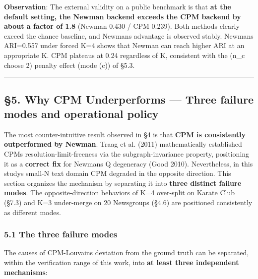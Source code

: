 \documentclass[
]{article}
\begin{document}
\textbf{Observation}: The external validity on a public benchmark is
that \textbf{at the default setting, the Newman backend exceeds the CPM
backend by about a factor of 1.8} (Newman 0.430 / CPM 0.239). Both
methods clearly exceed the chance baseline, and Newman\textquotesingle s
advantage is observed stably. Newman\textquotesingle s ARI=0.557 under
forced K=4 shows that Newman can reach higher ARI at an appropriate K.
CPM plateaus at 0.24 regardless of K, consistent with the (n\_c choose
2) penalty effect (mode (c)) of §5.3.

\begin{center}\rule{0.5\linewidth}{0.5pt}\end{center}

\subsection{§5. Why CPM Underperforms --- Three failure modes and
operational
policy}\label{5-why-cpm-underperforms--three-failure-modes-and-operational-policy}

The most counter-intuitive result observed in §4 is that \textbf{CPM is
consistently outperformed by Newman}. Traag et al. (2011) mathematically
established CPM\textquotesingle s resolution-limit-freeness via the
subgraph-invariance property, positioning it as a \textbf{correct fix}
for Newman\textquotesingle s Q degeneracy (Good 2010). Nevertheless, in
this study\textquotesingle s small-N text domain CPM degraded in the
opposite direction. This section organizes the mechanism by separating
it into \textbf{three distinct failure modes}. The opposite-direction
behaviors of K=4 over-split on Karate Club (§7.3) and K=3 under-merge on
20 Newsgroups (§4.6) are positioned consistently as different modes.

\subsubsection{5.1 The three failure
modes}\label{51-the-three-failure-modes}

The causes of CPM-Louvain\textquotesingle s deviation from the ground
truth can be separated, within the verification range of this work, into
\textbf{at least three independent mechanisms}:
\end{document}
